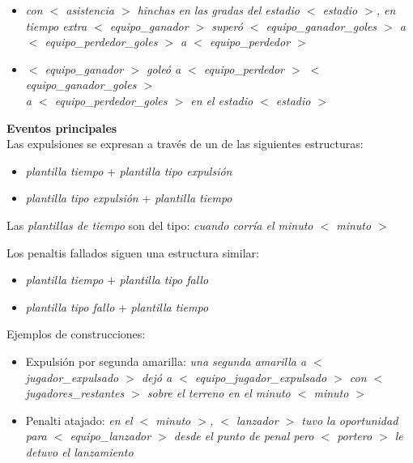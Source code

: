         \begin{itemize}
           \item  \textit{ con  $<$ asistencia $>$ hinchas en las gradas del estadio $<$ estadio $>$, en tiempo extra $<$ equipo\_ganador $>$ superó $<$ equipo\_ganador\_goles $>$ a \\$<$ equipo\_perdedor\_goles $>$ a $<$ equipo\_perdedor $>$ }
        
            \item  \textit{$<$ equipo\_ganador $>$ goleó a $<$ equipo\_perdedor $>$ $<$ equipo\_ganador\_goles $>$ \\a $<$ equipo\_perdedor\_goles $>$ en el estadio $<$ estadio $>$}
        \end{itemize}


\textbf{Eventos principales}\\


    Las expulsiones se expresan a través de un de las siguientes estructuras:
    \begin{itemize}
        \item \textit{plantilla tiempo} + \textit{plantilla tipo expulsión}
        \item \textit{plantilla tipo expulsión} + \textit{plantilla tiempo}
    \end{itemize}

    Las \textit{plantillas de tiempo} son del tipo: \textit{cuando corría el minuto $<$ minuto $>$}

    Los penaltis fallados siguen una estructura similar:
    \begin{itemize}
        \item \textit{plantilla tiempo} + \textit{plantilla tipo fallo}
        \item \textit{plantilla tipo fallo} + \textit{plantilla tiempo}
    \end{itemize}

    Ejemplos de construcciones: 

    \begin{itemize}
    \item Expulsión por segunda amarilla:  \textit{una segunda amarilla a $<$ jugador\_expulsado $>$ dejó 
    a $<$ equipo\_jugador\_expulsado $>$ con $<$ jugadores\_restantes $>$ sobre el terreno 
    en el minuto $<$ minuto $>$}
    
    \item Penalti atajado: \textit{en el $<$ minuto $>$, $<$ lanzador $>$ tuvo la oportunidad 
    para $<$ equipo\_lanzador $>$ desde el punto de penal pero $<$ portero $>$ le detuvo el lanzamiento}
    \end{itemize}


